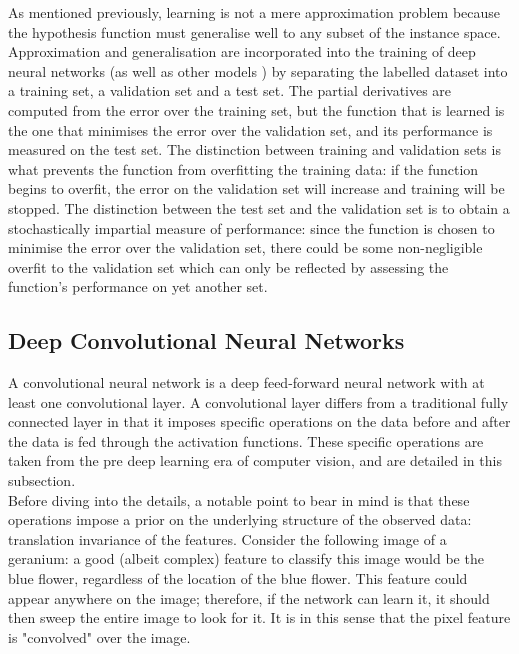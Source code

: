 \documentclass[a4paper,11pt]{article}
\begin{document}
As mentioned previously, learning is not a mere approximation problem because the hypothesis function must generalise well to any subset of the instance space. Approximation and generalisation are incorporated into the training of deep neural networks (as well as other models \cite{train&test}) by separating the labelled dataset into a training set, a validation set and a test set. The partial derivatives are computed from the error over the training set, but the function that is learned is the one that minimises the error over the validation set, and its performance is measured on the test set. The distinction between training and validation sets is what prevents the function from overfitting the training data: if the function begins to overfit, the error on the validation set will increase and training will be stopped. The distinction between the test set and the validation set is to obtain a stochastically impartial measure of performance: since the function is chosen to minimise the error over the validation set, there could be some non-negligible overfit to the validation set which can only be reflected by assessing the function's performance on yet another set.


\clearpage

\subsection{Deep Convolutional Neural Networks}

A convolutional neural network is a deep feed-forward neural network with at least one convolutional layer. A convolutional layer differs from a traditional fully connected layer in that it imposes specific operations on the data before and after the data is fed through the activation functions. These specific operations are taken from the pre deep learning era of computer vision, and are detailed in this subsection. \\

Before diving into the details, a notable point to bear in mind is that these operations impose a prior on the underlying structure of the observed data: translation invariance of the features. Consider the following image of a geranium: a good (albeit complex) feature to classify this image would be the blue flower, regardless of the location of the blue flower. This feature could appear anywhere on the image; therefore, if the network can learn it, it should then sweep the entire image to look for it. It is in this sense that the pixel feature is "convolved" over the image. \\
\end{document}
